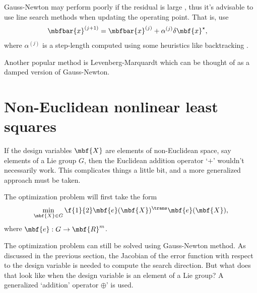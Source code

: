 \documentclass[ nobib, nofonts, notoc]{tufte-handout}
\begin{document}
    Gauss-Newton may perform poorly if the residual is large \cite{Nocedal_Numerical_2006,Fletcher_Practical_1987}, thus it's advisable to use line search methods when updating the operating point. That is, use
    \begin{align}
        \mbfbar{x}^{(j+1)} &= \mbfbar{x}^{(j)} + \alpha^{(j)}\delta\mbf{x}^{\star},
    \end{align}
    where $\alpha^{(j)}$ is a step-length computed using some heuristics like backtracking \cite{Nocedal_Numerical_2006}.

    Another popular method is Levenberg-Marquardt \cite{Dellaert_Factor_2017,Nocedal_Numerical_2006} which can be thought of as a damped version of Gauss-Newton.

    \section{Non-Euclidean nonlinear least squares}
    If the design variables $\mbf{X}$ are elements of non-Euclidean space, say elements of a Lie group $G$, then the Euclidean addition operator `$+$' wouldn't necessarily work.
    This complicates things a little bit, and a more generalized approach must be taken.

    The optimization problem will first take the form
    \begin{align}
        \min_{\mbf{X}\in G} \f{1}{2}\mbf{e}(\mbf{X})^{\trans}\mbf{e}(\mbf{X}),
    \end{align}
    where $\mbf{e} : G \to \mbf{R}^{m}$.

    The optimization problem can still be solved using Gauss-Newton method.
    As discussed in the previous section, the Jacobian of the error function with respect to the design variable is needed to compute the search direction.
    But what does that look like when the design variable is an element of a Lie group?
    A generalized `addition' operator $\oplus$' is used.
\end{document}
